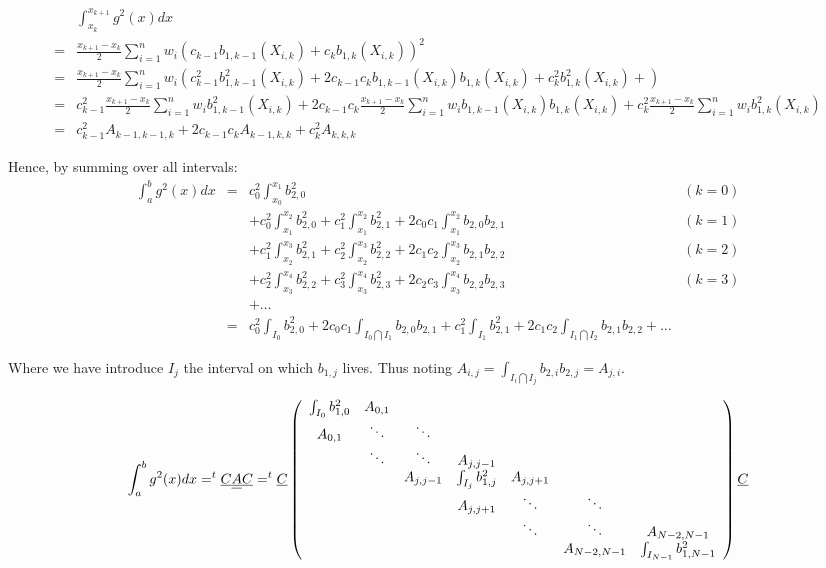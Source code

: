 \documentclass[paper=a4, fontsize=11pt]{book}
\numberwithin{equation}{section}		%
\numberwithin{figure}{section}			%
\numberwithin{table}{section}				%
\begin{document}
\begin{landscape}
$$
\begin{array}{lll}
& \int_{x_k}^{x_{k+1}} g^2(x)dx\\
= & \frac{x_{k+1}-x_k}{2}\sum_{i=1}^n w_i \left(c_{k-1}b_{1,k-1}\left(X_{i,k}\right) + c_{k}b_{1,k}\left(X_{i,k}\right)\right)^2\\
= & \frac{x_{k+1}-x_k}{2}\sum_{i=1}^n w_i \left(c_{k-1}^2b_{1,k-1}^2\left(X_{i,k}\right) + 2c_{k-1}c_{k}b_{1,k-1}\left(X_{i,k}\right)b_{1,k}\left(X_{i,k}\right) + c_{k}^2b_{1,k}^2\left(X_{i,k}\right) + \right)\\
= & c_{k-1}^2\frac{x_{k+1}-x_k}{2}\sum_{i=1}^n w_ib_{1,k-1}^2\left(X_{i,k}\right) + 2c_{k-1}c_{k}\frac{x_{k+1}-x_k}{2}\sum_{i=1}^n w_ib_{1,k-1}\left(X_{i,k}\right)b_{1,k}\left(X_{i,k}\right) + c_{k}^2\frac{x_{k+1}-x_k}{2}\sum_{i=1}^n w_ib_{1,k}^2\left(X_{i,k}\right)\\
= & c_{k-1}^2A_{k-1,k-1,k} + 2c_{k-1}c_{k}A_{k-1,k,k} + c_{k}^2A_{k,k,k}
\end{array}
$$

Hence, by summing over all intervals:
$$
\begin{array}{llll}
\int_{a}^{b} g^2(x)dx & = & c_{0}^2\int_{x_0}^{x_{1}}b_{2,0}^2 & (k=0)\\
&& + c_{0}^2\int_{x_1}^{x_{2}}b_{2,0}^2 + c_{1}^2\int_{x_1}^{x_{2}}b_{2,1}^2 + 2c_{0}c_{1}\int_{x_1}^{x_{2}}b_{2,0}b_{2,1} & (k=1)\\
&& + c_{1}^2\int_{x_2}^{x_{3}}b_{2,1}^2 + c_{2}^2\int_{x_2}^{x_{3}}b_{2,2}^2 + 2c_{1}c_{2}\int_{x_2}^{x_{3}}b_{2,1}b_{2,2} & (k=2)\\
&& + c_{2}^2\int_{x_3}^{x_{4}}b_{2,2}^2 + c_{3}^2\int_{x_3}^{x_{4}}b_{2,3}^2 + 2c_{2}c_{3}\int_{x_3}^{x_{4}}b_{2,2}b_{2,3} & (k=3)\\
&& + \hdots &\\
& = & c_{0}^2\int_{I_0}b_{2,0}^2 + 2c_{0}c_{1}\int_{I_0\bigcap I_1}b_{2,0}b_{2,1} + c_{1}^2\int_{I_1}b_{2,1}^2 + 2c_{1}c_{2}\int_{I_1\bigcap I_2}b_{2,1}b_{2,2} + \hdots&
\end{array}
$$

Where we have introduce $I_j$ the interval on which $b_{1,j}$ lives. Thus noting $A_{i,j} = \int_{I_i\bigcap I_j}b_{2,i}b_{2,j} = A_{j,i}$.

$$
\int_{a}^{b} g^2(x)dx = ^t\underline{C}\underline{\underline{A}}\underline{C} = ^t\underline{C} \left(\begin{array}{ccccccc} \int_{I_0}b_{1,0}^2&A_{0,1}&&&&&\\ A_{0,1}&\ddots&\ddots&&&&\\ &\ddots&\ddots&A_{j,j-1}&&&\\ &&A_{j,j-1}&\int_{I_j}b_{1,j}^2&A_{j,j+1}&&\\ &&&A_{j,j+1}&\ddots&\ddots&\\ &&&&\ddots&\ddots&A_{N-2,N-1}\\ &&&&&A_{N-2,N-1}&\int_{I_{N-1}}b_{1,N-1}^2 \end{array}\right) \underline{C}\\
$$



\end{landscape}
\end{document}
